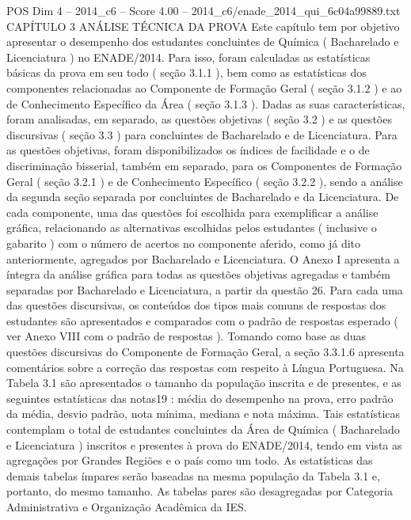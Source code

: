 \begin{textsample}{POS Dim 4 – 2014\_c6 – Score 4.00 – 2014\_c6/enade\_2014\_qui\_6c04a99889.txt}  \label{ex:f4_pos_074}
CAPÍTULO 3 ANÁLISE TÉCNICA DA PROVA Este capítulo tem por objetivo apresentar o desempenho dos estudantes concluintes de Química ( Bacharelado e Licenciatura ) no ENADE/2014.
Para isso, foram calculadas as estatísticas básicas da prova em seu todo ( seção 3.1.1 ), bem como as estatísticas dos componentes relacionadas ao Componente de Formação Geral ( seção 3.1.2 ) e ao de Conhecimento Específico da Área ( seção 3.1.3 ).
Dadas as suas características, foram analisadas, em separado, as questões objetivas ( seção 3.2 ) e as questões discursivas ( seção 3.3 ) para concluintes de Bacharelado e de Licenciatura.
Para as questões objetivas, foram disponibilizados os índices de facilidade e o de discriminação bisserial, também em separado, para os Componentes de Formação Geral ( seção 3.2.1 ) e de Conhecimento Específico ( seção 3.2.2 ), sendo a análise da segunda seção separada por concluintes de Bacharelado e da Licenciatura.
De cada componente, uma das questões foi escolhida para exemplificar a análise gráfica, relacionando as alternativas escolhidas pelos estudantes ( inclusive o gabarito ) com o número de acertos no componente aferido, como já dito anteriormente, agregados por Bacharelado e Licenciatura.
O Anexo I apresenta a íntegra da análise gráfica para todas as questões objetivas agregadas e também separadas por Bacharelado e Licenciatura, a partir da questão 26.
Para cada uma das questões discursivas, os conteúdos dos tipos mais comuns de respostas dos estudantes são apresentados e comparados com o padrão de respostas esperado ( ver Anexo VIII com o padrão de respostas ).
Tomando como base as duas questões discursivas do Componente de Formação Geral, a seção 3.3.1.6 apresenta comentários sobre a correção das respostas com respeito à Língua Portuguesa.
Na Tabela 3.1 são apresentados o tamanho da população inscrita e de presentes, e as seguintes estatísticas das notas19 : média do desempenho na prova, erro padrão da média, desvio padrão, nota mínima, mediana e nota máxima.
Tais estatísticas contemplam o total de estudantes concluintes da Área de Química ( Bacharelado e Licenciatura ) inscritos e presentes à prova do ENADE/2014, tendo em vista as agregações por Grandes Regiões e o país como um todo.
As estatísticas das demais tabelas ímpares serão baseadas na mesma população da Tabela 3.1 e, portanto, do mesmo tamanho.
As tabelas pares são desagregadas por Categoria Administrativa e Organização Acadêmica da IES.

\end{textsample}
